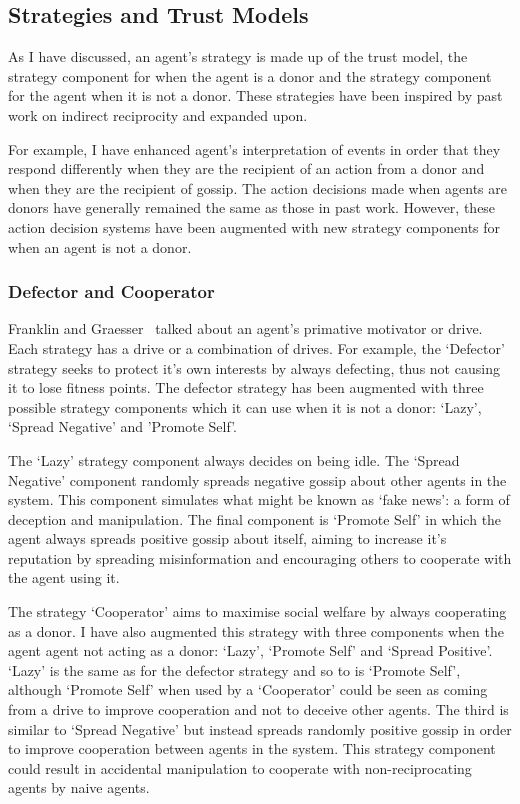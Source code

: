 \documentclass[]{final_report}
\begin{document}
\subsection{Strategies and Trust Models}
\label{subs:stratstrustmodels}
As I have discussed, an agent's strategy is made up of the trust model, the strategy component for when the agent is a donor and the strategy component for the agent when it is not a donor. These strategies have been inspired by past work on indirect reciprocity and expanded upon.\par 
For example, I have enhanced agent's interpretation of events in order that they respond differently when they are the recipient of an action from a donor and when they are the recipient of gossip. The action decisions made when agents are donors have generally remained the same as those in past work. However, these action decision systems have been augmented with new strategy components for when an agent is not a donor.\par 

\subsubsection{Defector and Cooperator}
Franklin and Graesser~\cite{franklin1996agent} talked about an agent's primative motivator or drive. Each strategy has a drive or a combination of drives. For example, the `Defector' strategy seeks to protect it's own interests by always defecting, thus not causing it to lose fitness points. The defector strategy has been augmented with three possible strategy components which it can use when it is not a donor: `Lazy', `Spread Negative' and 'Promote Self'.\par
The `Lazy' strategy component always decides on being idle. The `Spread Negative' component randomly spreads negative gossip about other agents in the system. This component simulates what might be known as `fake news': a form of deception and manipulation. The final component is `Promote Self' in which the agent always spreads positive gossip about itself, aiming to increase it's reputation by spreading misinformation and encouraging others to cooperate with the agent using it.\par 
The strategy `Cooperator' aims to maximise social welfare by always cooperating as a donor. I have also augmented this strategy with three components when the agent agent not acting as a donor: `Lazy', `Promote Self' and `Spread Positive'. `Lazy' is the same as for the defector strategy and so to is `Promote Self', although `Promote Self' when used by a `Cooperator' could be seen as coming from a drive to improve cooperation and not to deceive other agents. The third is similar to `Spread Negative' but instead spreads randomly positive gossip in order to improve cooperation between agents in the system. This strategy component could result in accidental manipulation to cooperate with non-reciprocating agents by naive agents.\par 
\end{document}

